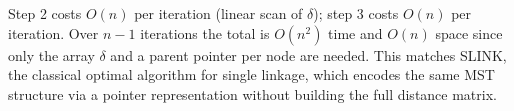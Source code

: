 Step 2 costs $O(n)$ per iteration (linear scan of $\delta$); step 3 costs $O(n)$ per iteration.
Over $n-1$ iterations the total is $O(n^2)$ time and $O(n)$ space since only the array $\delta$ and a parent pointer per node are needed.
This matches SLINK, the classical optimal algorithm for single linkage, which encodes the same MST structure via a pointer representation without building the full distance matrix.
\fi

%
%
%
%
%
%
%
%
%
